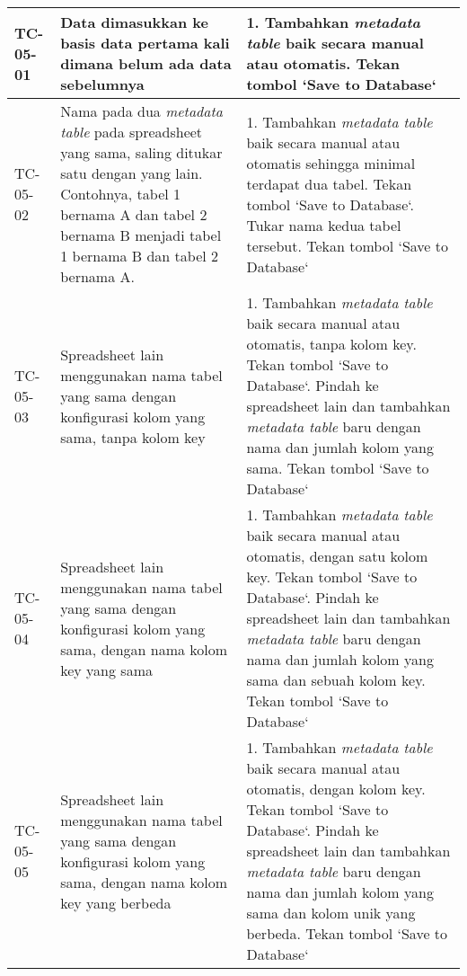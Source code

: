 \begin{small}
\begin{longtable}{ | p{2cm} | p{4cm} | p{7cm} | }
	TC-05-01 & Data dimasukkan ke basis data pertama kali dimana belum ada data sebelumnya & 1. Tambahkan \textit{metadata table} baik secara manual atau otomatis\newline 2. Tekan tombol `Save to Database`\\ \hline 
	TC-05-02 & Nama pada dua \textit{metadata table} pada spreadsheet yang sama, saling ditukar satu dengan yang lain. Contohnya, tabel 1 bernama A dan tabel 2 bernama B menjadi tabel 1 bernama B dan tabel 2 bernama A. & 1. Tambahkan \textit{metadata table} baik secara manual atau otomatis sehingga minimal terdapat dua tabel\newline 2. Tekan tombol `Save to Database`\newline 3. Tukar nama kedua tabel tersebut\newline 4. Tekan tombol `Save to Database`\\ \hline 
	TC-05-03 & Spreadsheet lain menggunakan nama tabel yang sama dengan konfigurasi kolom yang sama, tanpa kolom key & 1. Tambahkan \textit{metadata table} baik secara manual atau otomatis, tanpa kolom key\newline 2. Tekan tombol `Save to Database`\newline 3. Pindah ke spreadsheet lain dan tambahkan \textit{metadata table} baru dengan nama dan jumlah kolom yang sama\newline 4. Tekan tombol `Save to Database`\newline \\ \hline 
	TC-05-04 & Spreadsheet lain menggunakan nama tabel yang sama dengan konfigurasi kolom yang sama, dengan nama kolom key yang sama & 1. Tambahkan \textit{metadata table} baik secara manual atau otomatis, dengan satu kolom key\newline 2. Tekan tombol `Save to Database`\newline 3. Pindah ke spreadsheet lain dan tambahkan \textit{metadata table} baru dengan nama dan jumlah kolom yang sama dan sebuah kolom key\newline 4. Tekan tombol `Save to Database`\newline \\ \hline 
	TC-05-05 & Spreadsheet lain menggunakan nama tabel yang sama dengan konfigurasi kolom yang sama, dengan nama kolom key yang berbeda & 1. Tambahkan \textit{metadata table} baik secara manual atau otomatis, dengan kolom key\newline 2. Tekan tombol `Save to Database`\newline 3. Pindah ke spreadsheet lain dan tambahkan \textit{metadata table} baru dengan nama dan jumlah kolom yang sama dan kolom unik yang berbeda\newline 4. Tekan tombol `Save to Database`\newline \\ \hline 

\end{longtable}
\end{small}
